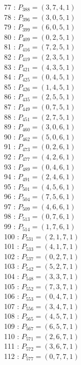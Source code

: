 \documentclass{article}
\begin{document}
{\begin{multicols}{3}
77 : $P_{388}=( 3, 7, 4, 1 )$\\
78 : $P_{396}=( 3, 0, 5, 1 )$\\
79 : $P_{399}=( 6, 0, 5, 1 )$\\
80 : $P_{409}=( 0, 2, 5, 1 )$\\
81 : $P_{416}=( 7, 2, 5, 1 )$\\
82 : $P_{419}=( 2, 3, 5, 1 )$\\
83 : $P_{421}=( 4, 3, 5, 1 )$\\
84 : $P_{425}=( 0, 4, 5, 1 )$\\
85 : $P_{426}=( 1, 4, 5, 1 )$\\
86 : $P_{435}=( 2, 5, 5, 1 )$\\
87 : $P_{449}=( 0, 7, 5, 1 )$\\
88 : $P_{451}=( 2, 7, 5, 1 )$\\
89 : $P_{460}=( 3, 0, 6, 1 )$\\
90 : $P_{462}=( 5, 0, 6, 1 )$\\
91 : $P_{473}=( 0, 2, 6, 1 )$\\
92 : $P_{477}=( 4, 2, 6, 1 )$\\
93 : $P_{489}=( 0, 4, 6, 1 )$\\
94 : $P_{491}=( 2, 4, 6, 1 )$\\
95 : $P_{501}=( 4, 5, 6, 1 )$\\
96 : $P_{504}=( 7, 5, 6, 1 )$\\
97 : $P_{509}=( 4, 6, 6, 1 )$\\
98 : $P_{513}=( 0, 7, 6, 1 )$\\
99 : $P_{514}=( 1, 7, 6, 1 )$\\
100 : $P_{531}=( 2, 1, 7, 1 )$\\
101 : $P_{533}=( 4, 1, 7, 1 )$\\
102 : $P_{537}=( 0, 2, 7, 1 )$\\
103 : $P_{542}=( 5, 2, 7, 1 )$\\
104 : $P_{548}=( 3, 3, 7, 1 )$\\
105 : $P_{552}=( 7, 3, 7, 1 )$\\
106 : $P_{553}=( 0, 4, 7, 1 )$\\
107 : $P_{556}=( 3, 4, 7, 1 )$\\
108 : $P_{565}=( 4, 5, 7, 1 )$\\
109 : $P_{567}=( 6, 5, 7, 1 )$\\
110 : $P_{571}=( 2, 6, 7, 1 )$\\
111 : $P_{572}=( 3, 6, 7, 1 )$\\
112 : $P_{577}=( 0, 7, 7, 1 )$\\
\end{multicols}


}
\end{document}
